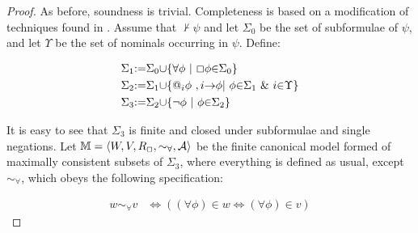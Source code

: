 \begin{proof}
  As before, soundness is trivial.  Completeness is based on a modification
  of techniques found in {\cite[chapter 5]{boolos_logic_1995}}.  Assume
  that $\nvdash \psi$ and let $\Sigma_0$ be the set of subformulae of $\psi$,
  and let $\Upsilon$ be the set of nominals occurring in $\psi$.  Define:
  
  \begin{align*}
    {\Sigma}_1 &
    {\assign}{\Sigma}_0{\cup}\{{\forall}{\phi}{\ }|{\ }\Box{\phi}{\in}{\Sigma}_0\}\\
    {\Sigma}_2 &
    {\assign}{\Sigma}_1{\cup}\{\text{@}_i{\phi}{\ },i{\rightarrow}{\phi}|{\ }{\phi}{\in}{\Sigma}_1{\ }\&{\ }i{\in}{\Upsilon}\}\\
    {\Sigma}_3 &
    {\assign}{\Sigma}_2{\cup}\{{\neg}{\phi}{\ }|{\ }{\phi}{\in}{\Sigma}_2\}
  \end{align*}
  
  It is easy to see that $\Sigma_3$ is finite and closed under subformulae and
  single negations. Let $\mathbbm{M}= \langle W, V, R_{\Box}, \sim_{\forall},
  \mathcal{A} \rangle$ be the finite canonical model formed of maximally
  consistent subsets of $\Sigma_3$, where everything is defined as usual,
  except $\sim_{\forall}$, which obeys the following specification:
  
  \begin{align*}
    w {\sim}_{{\forall}}v & {\Longleftrightarrow}(({\forall}{\phi}){\in}w
    {\Longleftrightarrow}({\forall}{\phi}){\in}v)
  \end{align*}
  

\end{proof}
